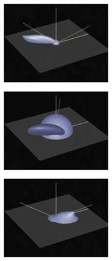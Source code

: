 \begin{figure}
\begin{fullwidth}
\begin{center}
\begin{subfigure}[b]{0.328\thewidth}
		\includegraphics[width=1.\textwidth]{graphics/gi/ray-optics-8-3}
	\end{subfigure}
	\begin{subfigure}[b]{0.328\thewidth}
		\includegraphics[width=1.\textwidth]{graphics/gi/ray-optics-8-4}
	\end{subfigure}
	\begin{subfigure}[b]{0.328\thewidth}
		\includegraphics[width=1.\textwidth]{graphics/gi/ray-optics-8-5}

\end{subfigure}
\end{center}
\end{fullwidth}
\end{figure}
